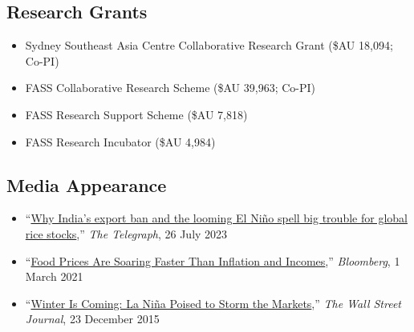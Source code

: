 \documentclass[10pt]{article}
\begin{document}
	\subsection*{Research Grants}
	\begin{itemize}
		\item {} Sydney Southeast Asia Centre Collaborative Research Grant (\$AU 18,094; Co-PI)
		\item {} FASS Collaborative Research Scheme (\$AU 39,963; Co-PI)
		\item {} FASS Research Support Scheme (\$AU 7,818)
		\item {} FASS Research Incubator (\$AU 4,984)
	\end{itemize}
	
	\subsection*{Media Appearance}
	\begin{itemize}
		\item ``\href{https://www.telegraph.co.uk/global-health/climate-and-people/india-rice-export-global-ban-food-security-shortsages/}{Why India’s export ban and the looming El Niño spell big trouble for global rice stocks},'' \textit{The Telegraph}, 26 July 2023
		\item ``\href{https://www.bloomberg.com/news/articles/2021-03-01/inflation-2021-malnutrition-and-hunger-fears-rise-as-food-prices-soar-globally}{Food Prices Are Soaring Faster Than Inflation and Incomes},'' \textit{Bloomberg}, 1 March 2021
		\item ``\href{https://www.wsj.com/articles/winter-is-coming-la-nina-poised-to-storm-the-markets-1450850704}{Winter Is Coming: La Niña Poised to Storm the Markets},'' \textit{The Wall Street Journal}, 23 December 2015
	\end{itemize}
	
\end{document}
